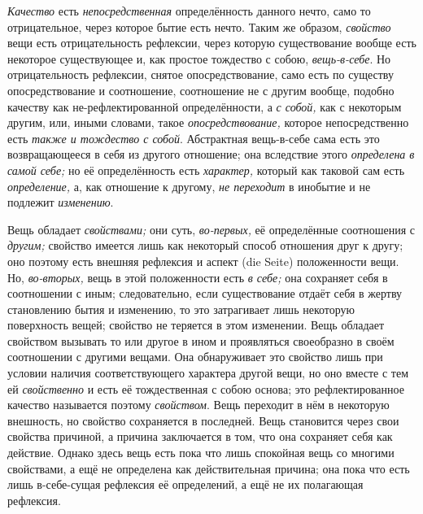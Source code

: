 {\em Качество} есть {\em непосредственная} определённость данного нечто,
само то отрицательное, через которое бытие есть нечто. Таким же образом,
{\em свойство} вещи есть отрицательность рефлексии,
через которую существование вообще есть некоторое существующее и, как
простое тождество с собою, {\em вещь-в-себе}. Но
отрицательность рефлексии, снятое опосредствование, само есть по существу
опосредствование и соотношение, соотношение не с другим вообще, подобно
качеству как не-рефлектированной определённости, а
{\em с собой,} как с некоторым другим, или, иными
словами, такое {\em опосредствование,} которое
непосредственно есть {\em также и тождество с собой}.
Абстрактная вещь-в-себе сама есть это возвращающееся в себя из другого
отношение; она вследствие этого {\em определена в самой
себе;} но её определённость есть {\em характер,}
который как таковой сам есть {\em определение,} а, как
отношение к другому, {\em не переходит} в инобытие и не
подлежит {\em изменению}.

Вещь обладает {\em свойствами;} они суть,
{\em во-первых,} её определённые соотношения с
{\em другим;} свойство имеется лишь как некоторый
способ отношения друг к другу; оно поэтому есть внешняя рефлексия и аспект
(die Seite) положенности вещи. Но, {\em во-вторых,}
вещь в этой положенности есть {\em в себе;} она
сохраняет себя в соотношении с иным; следовательно, если существование
отдаёт себя в жертву становлению бытия и изменению, то это затрагивает лишь
некоторую поверхность вещей; свойство не теряется в этом изменении. Вещь
обладает свойством вызывать то или другое в ином и проявляться своеобразно
в своём соотношении с другими вещами. Она обнаруживает это свойство лишь
при условии наличия соответствующего характера другой вещи, но оно вместе с
тем ей {\em свойственно} и есть её тождественная с
собою основа; это рефлектированное качество называется поэтому
{\em свойством}. Вещь переходит в нём в некоторую
внешность, но свойство сохраняется в последней. Вещь становится через свои
свойства причиной, а причина заключается в том, что она сохраняет себя как
действие. Однако здесь вещь есть пока что лишь спокойная вещь со многими
свойствами, а ещё не определена как действительная причина; она пока что
есть лишь в-себе-сущая рефлексия её определений, а ещё не их полагающая
рефлексия.

